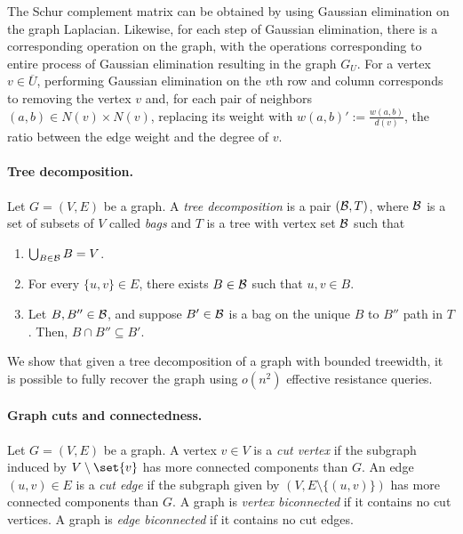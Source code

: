 The Schur complement matrix can be obtained by using Gaussian elimination on the graph Laplacian. Likewise, for each step of Gaussian elimination, there is a corresponding operation on the graph, with the operations corresponding to entire process of Gaussian elimination resulting in the graph $G_U$. For a vertex $v\in\overline{U}$, performing Gaussian elimination on the $v$th row and column corresponds to removing the vertex $v$ and, for each pair of neighbors $(a,b) \in N(v) \times N(v)$, replacing its weight with $w(a, b)' := \frac{w(a,b)}{d(v)}$, the ratio between the edge weight and the degree of $v$.

 
\paragraph{Tree decomposition.} Let $G=(V,E)$ be a graph. A \emph{tree decomposition} is a pair $({\cal B}, T)$, where ${\cal B}$ is a set of subsets of $V$ called \emph{bags} and $T$ is a tree with vertex set ${\cal B}$ such that
\begin{enumerate}[(1)]
    \item $\bigcup_{B\in{\cal B}} B = V$.
    \item For every $\{u,v\}\in E$, there exists $B\in{\cal B}$ such that $u,v\in B$.
    \item Let $B, B''\in {\cal B}$, and suppose $B'\in{\cal B}$ is a bag on the unique $B$ to $B''$ path in $T$.  Then, $B\cap B''\subseteq B'$.
\end{enumerate}

We show that given a tree decomposition of a graph with bounded treewidth, it is possible to fully recover the graph using $o(n^2)$ effective resistance queries.
\paragraph{Graph cuts and connectedness.}
Let $G=(V,E)$ be a graph.
A vertex $v \in V$ is a \emph{cut vertex} if the subgraph induced by $V \setminus \set{v}$ has more connected components than $G$.
An edge $(u,v) \in E$ is a \emph{cut edge} if the subgraph given by $(V, E \setminus \{(u,v)\})$ has more connected components than $G$.
A graph is \emph{vertex biconnected} if it contains no cut vertices.
A graph is \emph{edge biconnected} if it contains no cut edges.

    
